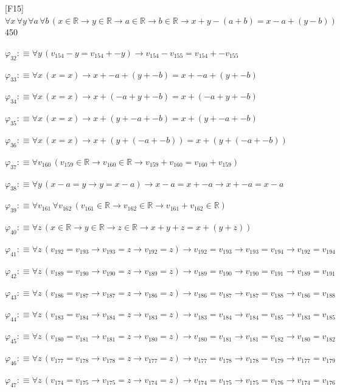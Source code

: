\begin{fullproof}{[F15]}{$\forall x\,\forall y\,\forall a\,\forall b\,(x \in \mathbb{R} \to y \in \mathbb{R} \to a \in \mathbb{R} \to b \in \mathbb{R} \to x + y - (a + b) = x - a + (y - b))$}{450}
\begin{abbrevlist}
\item $\varphi_{32} :\equiv \forall y\,(v_{154} - y = v_{154} + -y) \to v_{154} - v_{155} = v_{154} + -v_{155}$
\item $\varphi_{33} :\equiv \forall x\,(x = x) \to x + -a + (y + -b) = x + -a + (y + -b)$
\item $\varphi_{34} :\equiv \forall x\,(x = x) \to x + (-a + y + -b) = x + (-a + y + -b)$
\item $\varphi_{35} :\equiv \forall x\,(x = x) \to x + (y + -a + -b) = x + (y + -a + -b)$
\item $\varphi_{36} :\equiv \forall x\,(x = x) \to x + (y + (-a + -b)) = x + (y + (-a + -b))$
\item $\varphi_{37} :\equiv \forall v_{160}\,(v_{159} \in \mathbb{R} \to v_{160} \in \mathbb{R} \to v_{159} + v_{160} = v_{160} + v_{159})$
\item $\varphi_{38} :\equiv \forall y\,(x - a = y \to y = x - a) \to x - a = x + -a \to x + -a = x - a$
\item $\varphi_{39} :\equiv \forall v_{161}\,\forall v_{162}\,(v_{161} \in \mathbb{R} \to v_{162} \in \mathbb{R} \to v_{161} + v_{162} \in \mathbb{R})$
\item $\varphi_{40} :\equiv \forall z\,(x \in \mathbb{R} \to y \in \mathbb{R} \to z \in \mathbb{R} \to x + y + z = x + (y + z))$
\item $\varphi_{41} :\equiv \forall z\,(v_{192} = v_{193} \to v_{193} = z \to v_{192} = z) \to v_{192} = v_{193} \to v_{193} = v_{194} \to v_{192} = v_{194}$
\item $\varphi_{42} :\equiv \forall z\,(v_{189} = v_{190} \to v_{190} = z \to v_{189} = z) \to v_{189} = v_{190} \to v_{190} = v_{191} \to v_{189} = v_{191}$
\item $\varphi_{43} :\equiv \forall z\,(v_{186} = v_{187} \to v_{187} = z \to v_{186} = z) \to v_{186} = v_{187} \to v_{187} = v_{188} \to v_{186} = v_{188}$
\item $\varphi_{44} :\equiv \forall z\,(v_{183} = v_{184} \to v_{184} = z \to v_{183} = z) \to v_{183} = v_{184} \to v_{184} = v_{185} \to v_{183} = v_{185}$
\item $\varphi_{45} :\equiv \forall z\,(v_{180} = v_{181} \to v_{181} = z \to v_{180} = z) \to v_{180} = v_{181} \to v_{181} = v_{182} \to v_{180} = v_{182}$
\item $\varphi_{46} :\equiv \forall z\,(v_{177} = v_{178} \to v_{178} = z \to v_{177} = z) \to v_{177} = v_{178} \to v_{178} = v_{179} \to v_{177} = v_{179}$
\item $\varphi_{47} :\equiv \forall z\,(v_{174} = v_{175} \to v_{175} = z \to v_{174} = z) \to v_{174} = v_{175} \to v_{175} = v_{176} \to v_{174} = v_{176}$

\end{abbrevlist}
\end{fullproof}
